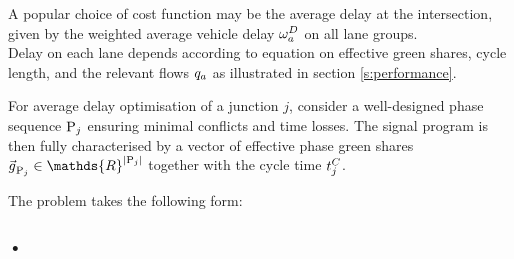 A popular choice of cost function may be the average delay at the intersection, given by the weighted average vehicle delay $\omega_{a}^{D}$ on all lane groups.\\Delay on each lane depends according to equation  on effective green shares, cycle length, and the relevant flows $q_a$ as illustrated in section \ref{s:performance}.

For average delay optimisation of a junction $j$, consider a well-designed phase sequence $\mathrm{P}_j$ ensuring minimal conflicts and time losses. The signal program is then fully characterised by a vector of effective phase green shares $\grenvec \in \mathds{R}^{|\phaset_j|}$ together with the cycle time $t_{j}^C$.

The problem takes the following form:


\subsubsection*{•}
